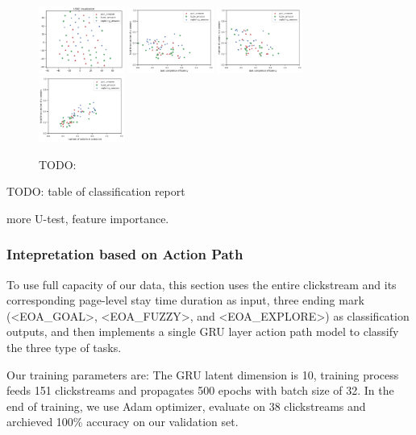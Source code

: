 \begin{figure}[H]
    \centering
    \includegraphics[width=0.25\textwidth]{figures/tsne-amazon}
    \includegraphics[width=0.25\textwidth]{figures/2d-eff-dur-amazon}
    \includegraphics[width=0.25\textwidth]{figures/2d-eff-len-amazon}
    \includegraphics[width=0.25\textwidth]{figures/2d-len-dur-amazon}
    \caption{TODO:}
    \label{fig:general-amazon}
\end{figure}

TODO: table of classification report

more U-test, feature importance.

\subsubsection{Intepretation based on Action Path}

To use full capacity of our data, this section uses the entire clickstream and its corresponding
page-level stay time duration as input, three ending mark (<EOA\_GOAL>, <EOA\_FUZZY>, and <EOA\_EXPLORE>) 
as classification outputs, and then implements a single GRU layer action path model 
to classify the three type of tasks.

Our training parameters are: 
The GRU latent dimension is 10, training process feeds 151 clickstreams and 
propagates 500 epochs with batch size of 32.
In the end of training, we use Adam optimizer, evaluate on 38 clickstreams and 
archieved 100\% accuracy on our validation set.

